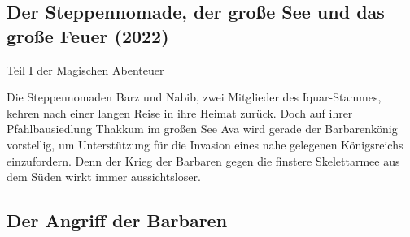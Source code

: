 \begin{chapterbox}
    \chapter{Der Steppennomade, der große See und das große Feuer (2022)}
    \label{2022-der-steppennomade-der-grosse-see-und-das-grosse-feuer}

    \begin{center}
        Teil I der Magischen Abenteuer
    \end{center}
    
    Die Steppennomaden Barz und Nabib, zwei Mitglieder des Iquar-Stammes, kehren nach einer langen Reise in ihre Heimat zurück. Doch auf ihrer Pfahlbausiedlung Thakkum im großen See Ava wird gerade der Barbarenkönig vorstellig, um Unterstützung für die Invasion eines nahe gelegenen Königsreichs einzufordern. Denn der Krieg der Barbaren gegen die finstere Skelettarmee aus dem Süden wirkt immer aussichtsloser.

    
\end{chapterbox}




\newpage
\section{Der Angriff der Barbaren}

